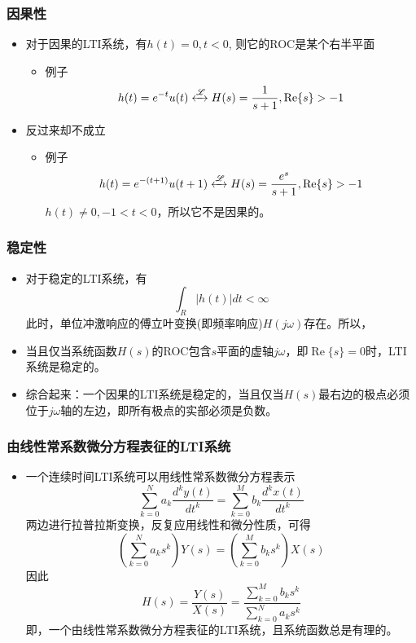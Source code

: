 \documentclass[CJKutf8,dvipsnames,table]{beamer}
\begin{document}
\begin{CJK*}{UTF8}{song}
  \begin{frame}
    \frametitle{因果性}
    \begin{itemize}
    \item 对于因果的LTI系统，有$h(t)=0, t < 0$,
	则它的ROC是某个右半平面
		\begin{itemize}
		\item 例子
		\[
			h(t) = e^{-t}u(t) \xleftrightarrow{\mathscr{L}} H(s) = \frac{1}{s+1}, \operatorname{Re}\{s\} > -1
		\]
		\end{itemize}
	\item 反过来却不成立
		\begin{itemize}
		\item 例子
		\[
			h(t) = e^{-(t+1)}u(t+1) \xleftrightarrow{\mathscr{L}} H(s) = \frac{e^s}{s+1}, \operatorname{Re}\{s\} > -1
		\]
		$h(t) \neq 0, -1 < t < 0$，所以它不是因果的。
		\end{itemize}
	
    \end{itemize}
  \end{frame}   
    
  \begin{frame}
    \frametitle{稳定性}
    \begin{itemize}
    \item 对于稳定的LTI系统，有
    \[
    	\int_R |h(t)|dt < \infty
    \]
    此时，单位冲激响应的傅立叶变换(即频率响应)$H(j\omega)$存在。所以，
    \item 当且仅当系统函数$H(s)$的ROC包含$s$平面的虚轴$j\omega$，即$\operatorname{Re}\{s\}=0$时，LTI系统是稳定的。
	\item 综合起来：一个因果的LTI系统是稳定的，当且仅当$H(s)$最右边的极点必须位于$j\omega$轴的左边，即所有极点的实部必须是负数。
	
    \end{itemize}
  \end{frame}   
      
  \begin{frame}
    \frametitle{由线性常系数微分方程表征的LTI系统}
    \begin{itemize}
    \item 一个连续时间LTI系统可以用线性常系数微分方程表示
    \[
    	\sum_{k=0}^{N} a_k \frac{d^k y(t)}{dt^k} = \sum_{k=0}^{M} b_k \frac{d^k x(t)}{dt^k}
    \]
    两边进行拉普拉斯变换，反复应用线性和微分性质，可得
    \[
    	(\sum_{k=0}^{N} a_k s^k)Y(s)  = (\sum_{k=0}^{M} b_k s^k ) X(s)
    \]
    因此
    \[
    	H(s) = \frac{Y(s)}{X(s)} = \frac{\sum_{k=0}^{M} b_k s^k}{\sum_{k=0}^{N} a_k s^k}    
    \]
    即，一个由线性常系数微分方程表征的LTI系统，且系统函数总是有理的。
    \end{itemize}
  \end{frame}    
  

\end{CJK*}
\end{document}
